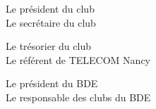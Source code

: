 \documentclass{article}
\begin{document}
	\begin{multicols}{2}
		Le président du club \\
		Le secrétaire du club 
	\end{multicols}
		\vspace*{4cm}
	\begin{multicols}{2}
		Le trésorier du club \\
		Le référent de TELECOM Nancy 
	\end{multicols}
		\vspace*{4cm}
	\begin{multicols}{2}
		Le président du BDE \\
		Le responsable des clubs du BDE 
	\end{multicols}
		\vspace*{4cm}
\end{document}
